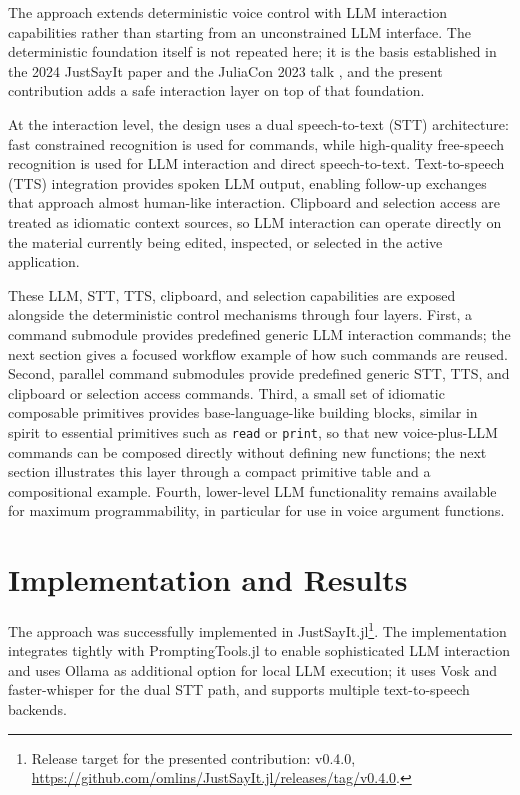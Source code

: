\documentclass{juliacon}
\begin{document}
The approach extends deterministic voice control with LLM interaction capabilities rather than starting from an unconstrained LLM interface. The deterministic foundation itself is not repeated here; it is the basis established in the 2024 JustSayIt paper \cite{omlin2024} and the JuliaCon 2023 talk \cite{omlin2023}, and the present contribution adds a safe interaction layer on top of that foundation.

At the interaction level, the design uses a dual speech-to-text (STT) architecture: fast constrained recognition is used for commands, while high-quality free-speech recognition is used for LLM interaction and direct speech-to-text. Text-to-speech (TTS) integration provides spoken LLM output, enabling follow-up exchanges that approach almost human-like interaction. Clipboard and selection access are treated as idiomatic context sources, so LLM interaction can operate directly on the material currently being edited, inspected, or selected in the active application.

These LLM, STT, TTS, clipboard, and selection capabilities are exposed alongside the deterministic control mechanisms through four layers. First, a command submodule provides predefined generic LLM interaction commands; the next section gives a focused workflow example of how such commands are reused. Second, parallel command submodules provide predefined generic STT, TTS, and clipboard or selection access commands. Third, a small set of idiomatic composable primitives provides base-language-like building blocks, similar in spirit to essential primitives such as \texttt{read} or \texttt{print}, so that new voice-plus-LLM commands can be composed directly without defining new functions; the next section illustrates this layer through a compact primitive table and a compositional example. Fourth, lower-level LLM functionality remains available for maximum programmability, in particular for use in voice argument functions.

\section{Implementation and Results}

The approach was successfully implemented in JustSayIt.jl\footnote{Release target for the presented contribution: v0.4.0, \url{https://github.com/omlins/JustSayIt.jl/releases/tag/v0.4.0}.}. The implementation integrates tightly with PromptingTools.jl \cite{promptingtools2025} to enable sophisticated LLM interaction and uses Ollama \cite{ollama2026} as additional option for local LLM execution; it uses Vosk \cite{vosk2020} and faster-whisper \cite{fasterwhisper2025} for the dual STT path, and supports multiple text-to-speech backends.
\end{document}
